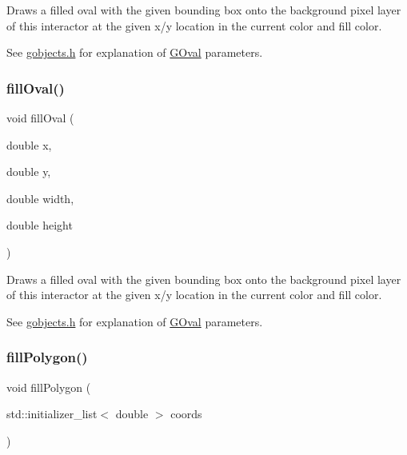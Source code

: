 Draws a filled oval with the given bounding box onto the background pixel layer of this interactor at the given x/y location in the current color and fill color. 

See \mbox{\hyperlink{gobjects_8h_source}{gobjects.\+h}} for explanation of \mbox{\hyperlink{classsgl_1_1GOval}{G\+Oval}} parameters. \mbox{\label{classsgl_1_1GDrawingSurface_a28c700c82f31cd328a4629273420ee61}} 
\subsubsection{\texorpdfstring{fill\+Oval()}{fillOval()}\hspace{0.1cm}{\footnotesize\ttfamily [2/2]}}
{\footnotesize\ttfamily void fill\+Oval (\begin{DoxyParamCaption}\item[{double}]{x,  }\item[{double}]{y,  }\item[{double}]{width,  }\item[{double}]{height }\end{DoxyParamCaption})\hspace{0.3cm}{\ttfamily [virtual]}}



Draws a filled oval with the given bounding box onto the background pixel layer of this interactor at the given x/y location in the current color and fill color. 

See \mbox{\hyperlink{gobjects_8h_source}{gobjects.\+h}} for explanation of \mbox{\hyperlink{classsgl_1_1GOval}{G\+Oval}} parameters. \mbox{\label{classsgl_1_1GDrawingSurface_a15f8c1c4409ef51c1a30a92a195b8f66}} 
\subsubsection{\texorpdfstring{fill\+Polygon()}{fillPolygon()}\hspace{0.1cm}{\footnotesize\ttfamily [1/2]}}
{\footnotesize\ttfamily void fill\+Polygon (\begin{DoxyParamCaption}\item[{std\+::initializer\+\_\+list$<$ double $>$}]{coords }\end{DoxyParamCaption})\hspace{0.3cm}{\ttfamily [virtual]}}



